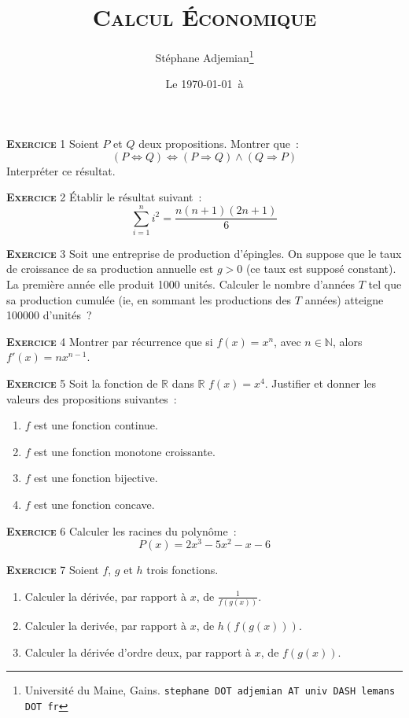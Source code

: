 \documentclass[10pt,a4paper,notitlepage]{article}
\newcommand{\exercice}[1]{\textsc{\textbf{Exercice}} #1}
\begin{document}
\title{\textsc{Calcul Économique}}
\author{Stéphane Adjemian\thanks{Université du Maine, Gains. \texttt{stephane DOT adjemian AT univ DASH lemans DOT fr}}}
\date{Le \today\ à \thistime}

\maketitle

\exercice{1} Soient $P$ et $Q$ deux propositions. Montrer  que :
\[
(P \Leftrightarrow Q) \Leftrightarrow (P \Rightarrow Q) \land (Q
\Rightarrow P)
\]
Interpréter ce résultat.

\bigskip

\exercice{2} Établir le résultat suivant :
\[
\sum_{i=1}^n i^2 = \frac{n(n+1)(2n+1)}{6} 
\]

\bigskip

\exercice{3} Soit une entreprise de production d'épingles. On suppose
que le taux de croissance de sa production annuelle est $g>0$ (ce taux
est supposé constant). La première année elle produit 1000
unités. Calculer le nombre d'années $T$ tel que sa production
cumulée (ie, en sommant les productions des $T$ années) atteigne
100000 d'unités ?

\bigskip

\exercice{4} Montrer par récurrence que si $f(x) = x^n$, avec $n\in\mathbb N$, alors 
$f'(x) = nx^{n-1}$.

\bigskip

\exercice{5} Soit la fonction de $\mathbb R$ dans $\mathbb R$ $f(x) =
x^4$. Justifier et donner les valeurs des propositions suivantes :
\begin{enumerate}
\item $f$ est une fonction continue.
\item $f$ est une fonction monotone croissante.
\item $f$ est une fonction bijective.
\item $f$ est une fonction concave.
\end{enumerate}

\bigskip

\exercice{6} Calculer les racines du polynôme :
\[
P(x) = 2x^3 - 5x^2 - x - 6
\]    

\exercice{7} Soient $f$, $g$ et $h$ trois fonctions.
\begin{enumerate}
\item Calculer la dérivée, par rapport à $x$, de $\frac{1}{f(g(x))}$.
\item Calculer la derivée, par rapport à $x$, de $h(f(g(x)))$.
\item Calculer la dérivée d'ordre deux, par rapport à $x$, de $f(g(x))$.  
\end{enumerate}
\end{document}
